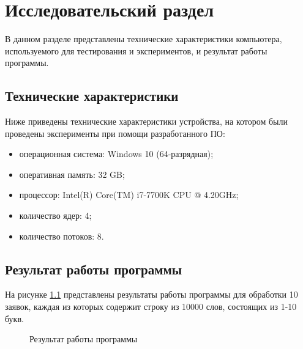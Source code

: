 \chapter{Исследовательский раздел}
В данном разделе представлены технические характеристики компьютера, используемого для тестирования и экспериментов, и результат работы программы.
 \section{Технические характеристики}

Ниже приведены технические характеристики устройства, на котором были проведены эксперименты при помощи разработанного ПО:

\begin{itemize}
	\item операционная система: Windows 10 (64-разрядная);
	\item оперативная память: 32 GB;
	\item процессор: Intel(R) Core(TM) i7-7700K CPU @ 4.20GHz;
	\item количество ядер: 4;
	\item количество потоков: 8.
\end{itemize}

\section{Результат работы программы}
На рисунке \ref{results} представлены результаты работы программы для обработки 10 заявок, каждая из которых содержит строку из 10000 слов, состоящих из 1-10 букв.

\newpage
\begin{figure}[h]
	\caption{Результат работы программы}
	\label{results}
\end{figure}

